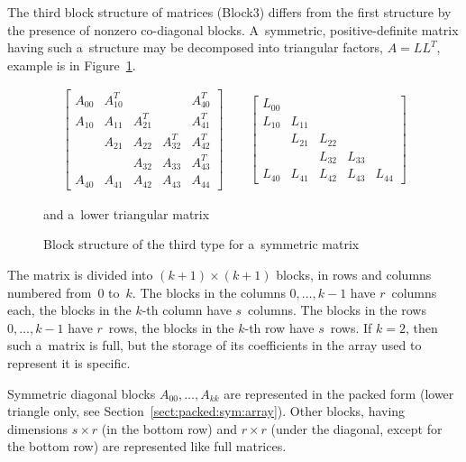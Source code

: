 The third block structure of matrices (Block3) differs from the
first structure by the presence of nonzero co-diagonal blocks.
A~symmetric, positive-definite matrix having such a~structure
may be decomposed into triangular factors, $A=LL^T$,
example is in Figure~\ref{fig:block3:sympos}.
\begin{figure}[ht]
  \begin{align*}
    \left[\begin{array}{ccccc}
      A_{00} & A_{10}^T & & & A_{40}^T \\
      A_{10} & A_{11} & A_{21}^T & & A_{41}^T \\
      & A_{21} & A_{22} & A_{32}^T & A_{42}^T \\
      & & A_{32} & A_{33} & A_{43}^T \\
      A_{40} & A_{41} & A_{42} & A_{43} & A_{44}
    \end{array}\right] \qquad
    \left[\begin{array}{ccccc}
      L_{00} & & & & \\
      L_{10} & L_{11} & & & \\
      & L_{21} & L_{22} & & \\
      & & L_{32} & L_{33} & \\
      L_{40} & L_{41} & L_{42} & L_{43} & L_{44}
    \end{array}\right]
  \end{align*}
  \caption{\label{fig:block3:sympos}Block structure of the third type for a~symmetric matrix}
  \centerline{and a~lower triangular matrix}
\end{figure}
The matrix is divided into $(k+1)\times(k+1)$ blocks, in rows and columns
numbered from~$0$ to~$k$. The blocks in the columns $0,\ldots,k-1$ have
$r$~columns each, the blocks in the $k$-th column have $s$~columns.
The blocks in the rows $0,\ldots,k-1$ have $r$~rows, the blocks in the
$k$-th row have $s$~rows.
If $k=2$, then such a~matrix is full, but the storage of its coefficients
in the array used to represent it is specific.

Symmetric diagonal blocks $A_{00},\ldots,A_{kk}$ are represented in the packed
form (lower triangle only, see Section~\ref{sect:packed:sym:array}). Other blocks,
having dimensions $s\times r$ (in the bottom row) and $r\times r$
(under the diagonal, except for the bottom row)
are represented like full matrices.


\vspace{\bigskipamount}

